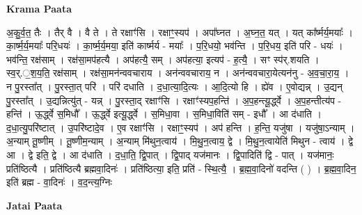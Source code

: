 \documentclass[17pt]{extarticle}
\begin{document}
\textbf{Krama Paata} \newline

अ॒कु॒र्व॒त॒ तैः । तैर् वै । वै ते । ते रक्षाꣳ॑सि । रक्षाꣳ॒॒स्यप॑ । अपा᳚घ्नत । अ॒घ्न॒त॒ यत् । यत् का᳚र्ष्मर्य॒मयाः᳚ । का॒र्ष्म॒र्य॒मयाः᳚ परि॒धयः॑ । का॒र्ष्म॒र्य॒मया॒ इति॑ कार्ष्मर्य - मयाः᳚ । प॒रि॒धयो॒ भव॑न्ति । प॒रि॒धय॒ इति॑ परि - धयः॑ । भव॑न्ति॒ रक्ष॑साम् । रक्ष॑सा॒मप॑हत्यै । अप॑हत्यै॒ सम् । अप॑हत्या॒ इत्यप॑ - ह॒त्यै॒ । सꣳ स्प॑र्.शयति । स्व॒र्.॒श॒य॒ति॒ रक्ष॑साम् । रक्ष॑सा॒मन॑न्ववचाराय । अन॑न्ववचाराय॒ न । अन॑न्ववचारा॒येत्यन॑नु - अ॒व॒चा॒रा॒य॒ । न पु॒रस्ता᳚त् । पु॒रस्ता॒त् परि॑ । परि॑ दधाति । द॒धा॒त्या॒दि॒त्यः । आ॒दि॒त्यो हि । ह्ये॑व । ए॒वोद्यन्न् । उ॒द्यन् पु॒रस्ता᳚त् । उ॒द्यन्नित्यु॑त् - यन्न् । पु॒रस्ता॒द् रक्षाꣳ॑सि । रक्षाꣳ॑स्यप॒हन्ति॑ । अ॒प॒हन्त्यू॒र्द्ध्वे । अ॒प॒हन्तीत्य॑प - हन्ति॑ । ऊ॒र्द्ध्वे स॒मिधौ᳚ । ऊ॒र्द्ध्वे इत्यू॒र्द्ध्वे । स॒मिधा॒वा । स॒मिधा॒विति॑ सम् - इधौ᳚ । आ द॑धाति । द॒धा॒त्यु॒परि॑ष्टात् । उ॒परि॑ष्टादे॒व । ए॒व रक्षाꣳ॑सि । रक्षाꣳ॒॒स्यप॑ । अप॑ हन्ति । ह॒न्ति॒ यजु॑षा । यजु॑षा॒ऽन्याम् । अ॒न्याम् तू॒ष्णीम् । तू॒ष्णीम॒न्याम् । अ॒न्याम् मि॑थुन॒त्वाय॑ । मि॒थु॒न॒त्वाय॒ द्वे । मि॒थु॒न॒त्वायेति॑ मिथुन - त्वाय॑ । द्वे आ । द्वे इति॒ द्वे । आ द॑धाति । द॒धा॒ति॒ द्वि॒पात् । द्वि॒पाद् यज॑मानः । द्वि॒पादिति॑ द्वि - पात् । यज॑मानः॒ प्रति॑ष्ठित्यै । प्रति॑ष्ठित्यै ब्रह्मवा॒दिनः॑ । प्रति॑ष्ठित्या॒ इति॒ प्रति॑ - स्थि॒त्यै॒ । ब्र॒ह्म॒वा॒दिनो॑ वदन्ति ( ) । ब्र॒ह्म॒वा॒दिन॒ इति॑ ब्रह्म - वा॒दिनः॑ । व॒द॒न्त्य॒ग्निः \newline

\textbf{Jatai Paata} \newline
\end{document}
